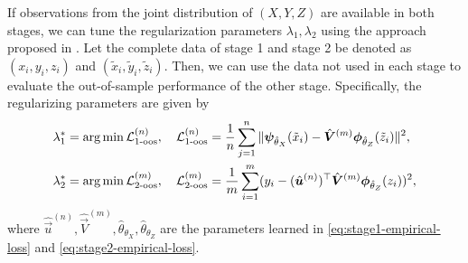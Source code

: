 

If observations from the joint distribution of $(X, Y, Z)$ are available in both stages, we can tune the regularization parameters $\lambda_1, \lambda_2$ using the approach proposed in \citet{Singh2019}. Let the complete data of stage 1 and stage 2 be denoted as $(x_i, y_i, z_i)$ and $(\tilde x_i, \tilde y_i, \tilde z_i)$. Then, we can use the data not used in each stage to evaluate the out-of-sample performance of the other stage. Specifically, the regularizing parameters are given by
\begin{align*}
    &\lambda_1^* = \operatorname*{arg\,min} \mathcal{L}_{1\text{-oos}}^{(n)}, \quad \mathcal{L}_{1\text{-oos}}^{(n)} = \frac1n \sum_{j=1}^n \|\bm{\psi}_{\hat\theta_X}(\tilde x_i) - \hat{\bm{V}}^{(m)}\bm{\phi}_{\hat\theta_Z}(\tilde z_i)\|^2,\\
    &\lambda_2^* = \operatorname*{arg\,min} \mathcal{L}_{2\text{-oos}}^{(m)}, \quad\mathcal{L}_{2\text{-oos}}^{(m)} = \frac1m \sum_{i=1}^m (y_i - (\hat{\bm{u}}^{(n)})^\top \hat{\bm{V}}^{(m)} \bm{\phi}_{\hat\theta_Z}(z_i))^2,
\end{align*}
where $\hat{\vec{u}}^{(n)}, \hat{\vec{V}}^{(m)}, \hat{\theta}_{\theta_X}, \hat{\theta}_{\theta_Z}$ are the parameters learned in \eqref{eq:stage1-empirical-loss} and \eqref{eq:stage2-empirical-loss}.
